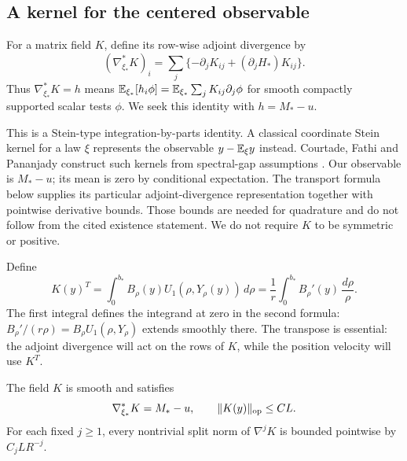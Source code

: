 \subsection{A kernel for the centered observable}

For a matrix field $K$, define its row-wise adjoint divergence by
\[
 (\nabla_{\xi_*}^*K)_i
 =\sum_j\{-\partial_jK_{ij}+(\partial_jH_*)K_{ij}\}.
\]
Thus $\nabla_{\xi_*}^*K=h$ means
$\mathbb E_{\xi_*}[h_i\phi]=\mathbb E_{\xi_*}\sum_jK_{ij}\partial_j\phi$
for smooth compactly supported scalar tests $\phi$.  We seek this
identity with $h=M_*-u$.

This is a Stein-type integration-by-parts identity.  A classical
coordinate Stein kernel for a law $\xi$ represents the observable
$y-\mathbb E_\xi y$ instead.  Courtade, Fathi and Pananjady construct such
kernels from spectral-gap assumptions
\citep[arXiv version~2, Definition~2.1 and Theorem~2.4]{courtade2019stein}.
Our observable is $M_*-u$; its mean is zero by conditional expectation.
The transport formula below supplies its particular adjoint-divergence
representation together with pointwise derivative bounds.  Those bounds
are needed for quadrature and do not follow from the cited existence
statement.  We do not require $K$ to be symmetric or positive.

Define
\begin{equation}\label{eq:stein-kernel}
 K(y)^T=\int_0^{b_*}B_\rho(y)U_1(\rho,Y_\rho(y))\,d\rho
       =\frac1r\int_0^{b_*}B_\rho'(y)\,\frac{d\rho}{\rho}.
\end{equation}
The first integral defines the integrand at zero in the second formula:
$B_\rho'/(r\rho)=B_\rho U_1(\rho,Y_\rho)$ extends smoothly there.
The transpose is essential: the adjoint divergence will act on the
rows of $K$, while the position velocity will use $K^T$.

\begin{lemma}\label{lem:centering-kernel}
The field $K$ is smooth and satisfies
\[
 \nabla_{\xi_*}^*K=M_*-u,\qquad \|K(y)\|_{\mathrm{op}}\le CL.
\]
For each fixed $j\ge1$, every nontrivial split norm of $\nabla^jK$ is
bounded pointwise by $C_jLR^{-j}$.
\end{lemma}

